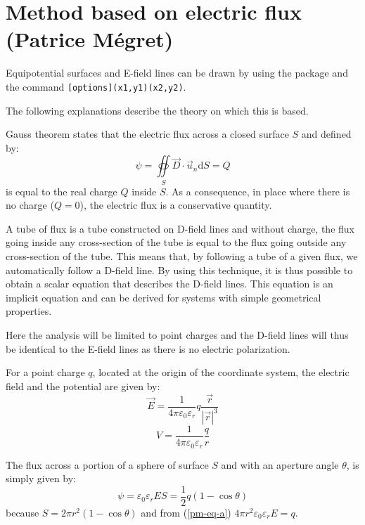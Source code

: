 \documentclass[11pt,english,english,BCOR10mm,DIV12,bibliography=totoc,parskip=false,smallheadings
    headexclude,footexclude,oneside]{pst-doc}
\begin{document}
\section{Method based on electric flux (Patrice Mégret)}

Equipotential surfaces and E-field lines can be drawn by using the package  and the command \verb+[options](x1,y1)(x2,y2)+. 

The following explanations describe the theory on which this is based.


Gauss theorem states that the electric flux across a closed surface $S$ and defined by:
\begin{equation}\label{pm-eq-a}
\psi = \oiint\limits_S \vec{D} \cdot \vec{u}_n \mathrm{d} S = Q
\end{equation} 
is equal to the real charge $Q$ inside $S$. As a consequence, in place where there is no charge ($Q=0$), the electric flux is a conservative quantity.


A tube of flux is a tube constructed on D-field lines and without charge, the flux going inside any cross-section of the tube is equal to the flux going outside any cross-section of the tube. This means that, by following a tube of a given flux, we automatically follow a D-field line. By using this technique, it is thus possible to obtain a scalar equation that describes the D-field lines. This equation is an implicit equation and can be derived for systems with simple geometrical properties.

Here the analysis will be limited to point charges and the D-field lines will thus be identical to the E-field lines as there is no electric polarization.
 

For a point charge $q$, located at the origin of the coordinate system, the electric field and the potential are given by:
\begin{equation}\label{pm-eq-b}
\vec{E} = \frac{1}{4 \pi \varepsilon_0 \varepsilon_r} q \frac{\vec{r}}{|\vec{r}|^3}
\end{equation}
\begin{equation}\label{pm-eq-c}
V = \frac{1}{4 \pi \varepsilon_0 \varepsilon_r} \frac{q}{r} 
\end{equation}

The flux across a portion of a sphere of surface $S$ and with an aperture angle  $\theta$, is simply given by:
\begin{equation}\label{pm-eq-d}
\psi = \varepsilon_0 \varepsilon_r E S = \frac{1}{2} q (1 -\cos\theta) 
\end{equation} 
because $S= 2\pi r^2 (1 - \cos\theta)$ and from (\ref{pm-eq-a}) $4 \pi r^2 \varepsilon_0 \varepsilon_r E =q$.
\end{document}
